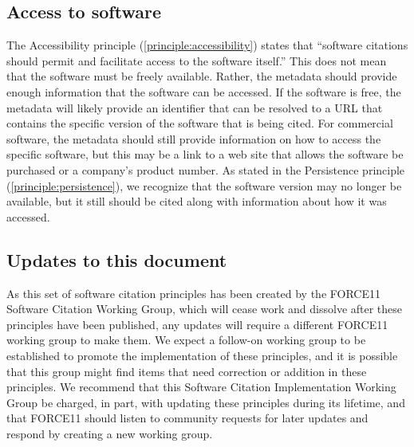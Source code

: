 \documentclass[11pt, oneside]{amsart}
\newcommand{\katznote}[1]{ {\textcolor{blue} { ***DSK: #1 }}} %
\newcommand{\LJHnote}[1]{ {\textcolor{fuschsia} { ***LJH: #1 }}} %
\begin{document}

\subsection{Access to software}

The Accessibility principle (\ref{principle:accessibility}) states that ``software citations should permit and facilitate access to the software itself.''
This does not mean that the software must be freely available.
Rather, the metadata should provide enough information that the software can be accessed.
If the software is free, the metadata will likely provide an identifier that can be resolved to a URL that contains the specific version of the software that is being cited.
For commercial software, the metadata should still provide information on how to access the specific software, but this may be a link to a web site that allows the software be purchased or a company's product number.
As stated in the Persistence principle (\ref{principle:persistence}), we recognize that the software version may no longer be available, but it still should be cited along with information about how it was accessed.


%

\subsection{Updates to this document}

As this set of software citation principles has been created by the FORCE11 Software Citation Working Group, which will cease work and dissolve after these principles have been published,
any updates will require a different FORCE11 working group to make them.
We expect a follow-on working group to be established to promote the implementation of
these principles, and it is possible that this group might find items that need correction or addition
in these principles.
We recommend that this Software Citation Implementation Working Group be charged, in part,
with updating these principles during its lifetime, and that FORCE11 should listen to community requests for later updates and respond by creating a new working group.
\end{document}
